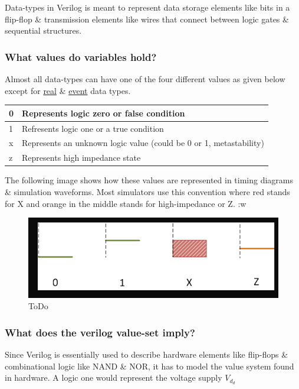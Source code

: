 \documentclass{article}
\begin{document}
	Data-types in Verilog is meant to represent data storage elements like bits in a flip-flop \& transmission elements like wires that connect between logic gates \& sequential structures. 

	\subsubsection{What values do variables hold?}

	Almost all data-types can have one of the four different values as given below except for \underline{real} \& \underline{event} data types. \newline \newline

	\begin{tabular}{|l|p{6cm}|}
		\hline
		0 & Represents logic zero or false condition \\
		\hline
		1 & Refresents logic one or a true condition \\
		\hline
		x & Represents an unknown logic value (could be 0 or 1, metastability) \\
		\hline
		z & Represents high impedance state \\
		\hline
	\end{tabular}

	The following image shows how these values are represented in timing diagrams \& simulation waveforms. Most simulators use this convention where red stands for X and orange in the middle
	stands for high-impedance or Z. \newline
	:w
	
	\begin{figure}[H]
		\includegraphics[width=\linewidth]{VerilogPics/figure_12.png}
		\caption{ToDo}
		\label{ToDo}
	\end{figure}

	\subsubsection{What does the verilog value-set imply?}

	Since Verilog is essentially used to describe hardware elements like flip-flops \& combinational logic like NAND \& NOR, it has to model the value system found in hardware. A logic one would
	represent the voltage supply $V_d_d$
\end{document}

